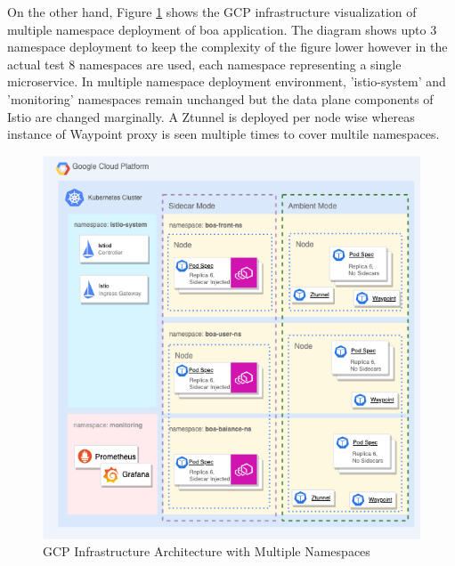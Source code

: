 On the other hand, Figure \ref{method:multiNsInfraArch} shows the GCP infrastructure visualization of multiple namespace deployment of \acrshort{boa} application. The diagram shows upto 3 namespace deployment to keep the complexity of the figure lower however in the actual test 8 namespaces are used, each namespace representing a single microservice. In multiple namespace deployment environment, 'istio-system' and 'monitoring' namespaces remain unchanged but the data plane components of Istio are changed marginally. A Ztunnel is deployed per node wise whereas instance of Waypoint proxy is seen multiple times to cover multile namespaces.
\begin{figure}[ht!]
    \centering
    \includegraphics[width=1.0\linewidth]{resources/multi-ns-test-infra.drawio.png}
    \caption{GCP Infrastructure Architecture with Multiple Namespaces}
    \label{method:multiNsInfraArch}
\end{figure}


